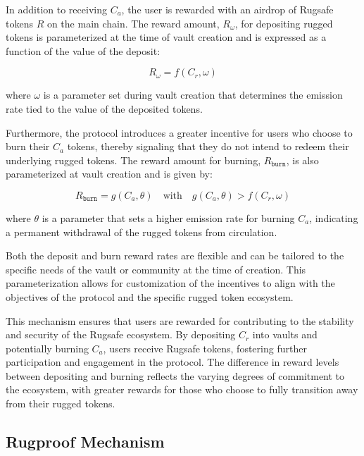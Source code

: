 \documentclass{article}
\begin{document}
In addition to receiving $C_a$, the user is rewarded with an airdrop of Rugsafe tokens $R$ on the main chain. The reward amount, $R_{\omega}$, for depositing rugged tokens is parameterized at the time of vault creation and is expressed as a function of the value of the deposit:

\[
R_{\omega} = f(C_r, \omega)
\]

where $\omega$ is a parameter set during vault creation that determines the emission rate tied to the value of the deposited tokens.

Furthermore, the protocol introduces a greater incentive for users who choose to burn their $C_a$ tokens, thereby signaling that they do not intend to redeem their underlying rugged tokens. The reward amount for burning, $R_{\texttt{burn}}$, is also parameterized at vault creation and is given by:

\[
R_{\texttt{burn}} = g(C_a, \theta) \quad \text{with} \quad g(C_a, \theta) > f(C_r, \omega)
\]

where $\theta$ is a parameter that sets a higher emission rate for burning $C_a$, indicating a permanent withdrawal of the rugged tokens from circulation.

Both the deposit and burn reward rates are flexible and can be tailored to the specific needs of the vault or community at the time of creation. This parameterization allows for customization of the incentives to align with the objectives of the protocol and the specific rugged token ecosystem.

This mechanism ensures that users are rewarded for contributing to the stability and security of the Rugsafe ecosystem. By depositing $C_r$ into vaults and potentially burning $C_a$, users receive Rugsafe tokens, fostering further participation and engagement in the protocol. The difference in reward levels between depositing and burning reflects the varying degrees of commitment to the ecosystem, with greater rewards for those who choose to fully transition away from their rugged tokens.













\subsection{Rugproof Mechanism}
\end{document}
